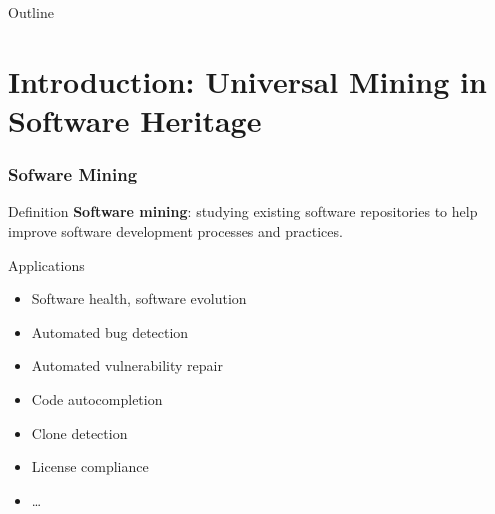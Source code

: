\documentclass[aspectratio=169,xcolor=table]{beamer}
\begin{document}
    \maketitle

    \begin{frame}{Outline}
        \tableofcontents
    \end{frame}

    \section{Introduction: Universal Mining in Software Heritage}

    \begin{frame}
        \frametitle{Sofware Mining}

        \begin{block}{Definition}
            \textbf{Software mining}: studying existing software repositories
            to help improve software development processes and practices.
        \end{block}

        \begin{block}{Applications}
            \begin{itemize}
                \item Software health, software evolution
                \item Automated bug detection
                \item Automated vulnerability repair
                \item Code autocompletion
                \item Clone detection
                \item License compliance
                \item …
            \end{itemize}
        \end{block}
    \end{frame}
\end{document}
